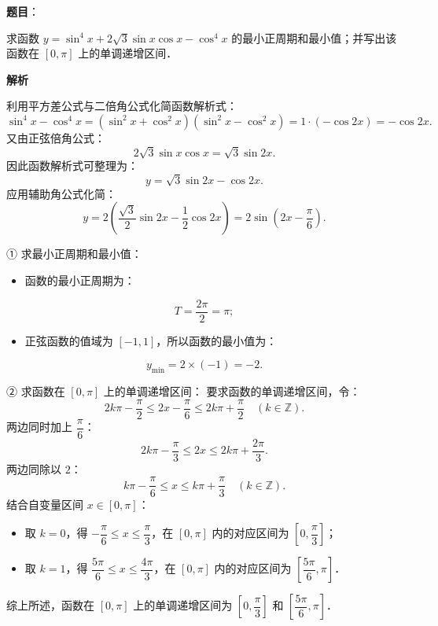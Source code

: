 \begin{answer}

\textbf{题目}：

求函数 $y = \sin^4 x + 2\sqrt{3} \sin x \cos x - \cos^4 x$ 的最小正周期和最小值；并写出该函数在 $[0, \pi]$ 上的单调递增区间．

\textbf{解析}

利用平方差公式与二倍角公式化简函数解析式：
\nopagebreak[4]
\[
\sin^4 x - \cos^4 x = (\sin^2 x + \cos^2 x)(\sin^2 x - \cos^2 x) = 1 \cdot (-\cos 2x) = -\cos 2x.
\]
又由正弦倍角公式：
\nopagebreak[4]
\[
2\sqrt{3}\sin x \cos x = \sqrt{3}\sin 2x.
\]
因此函数解析式可整理为：
\nopagebreak[4]
\[
y = \sqrt{3}\sin 2x - \cos 2x.
\]
应用辅助角公式化简：
\nopagebreak[4]
\[
y = 2\left(\frac{\sqrt{3}}{2}\sin 2x - \frac{1}{2}\cos 2x\right) = 2\sin\left(2x - \frac{\pi}{6}\right).
\]

① 求最小正周期和最小值：
\begin{itemize}
\item 函数的最小正周期为：
\end{itemize}
\nopagebreak[4]
\[
T = \frac{2\pi}{2} = \pi;
\]
\begin{itemize}
\item 正弦函数的值域为 $[-1, 1]$，所以函数的最小值为：
\end{itemize}
\nopagebreak[4]
\[
y_{\min} = 2 \times (-1) = -2.
\]

② 求函数在 $[0, \pi]$ 上的单调递增区间：
要求函数的单调递增区间，令：
\nopagebreak[4]
\[
2k\pi - \frac{\pi}{2} \leqslant 2x - \frac{\pi}{6} \leqslant 2k\pi + \frac{\pi}{2} \quad (k \in \mathbb{Z}).
\]
两边同时加上 $\dfrac{\pi}{6}$：
\nopagebreak[4]
\[
2k\pi - \frac{\pi}{3} \leqslant 2x \leqslant 2k\pi + \frac{2\pi}{3}.
\]
两边同除以 $2$：
\nopagebreak[4]
\[
k\pi - \frac{\pi}{6} \leqslant x \leqslant k\pi + \frac{\pi}{3} \quad (k \in \mathbb{Z}).
\]
结合自变量区间 $x \in [0, \pi]$：
\begin{itemize}
\item 取 $k = 0$，得 $-\dfrac{\pi}{6} \leqslant x \leqslant \dfrac{\pi}{3}$，在 $[0, \pi]$ 内的对应区间为 $\left[0, \dfrac{\pi}{3}\right]$；
\item 取 $k = 1$，得 $\dfrac{5\pi}{6} \leqslant x \leqslant \dfrac{4\pi}{3}$，在 $[0, \pi]$ 内的对应区间为 $\left[\dfrac{5\pi}{6}, \pi\right]$．
\end{itemize}

综上所述，函数在 $[0, \pi]$ 上的单调递增区间为 $\left[0, \dfrac{\pi}{3}\right]$ 和 $\left[\dfrac{5\pi}{6}, \pi\right]$．


\end{answer}
